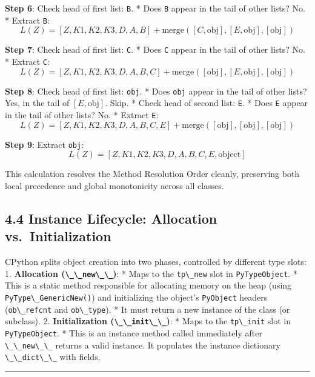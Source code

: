\textbf{Step 6}: Check head of first list: \passthrough{\lstinline!B!}.
* Does \passthrough{\lstinline!B!} appear in the tail of other lists?
No. * Extract \passthrough{\lstinline!B!}:
\[L(Z) = [Z, K1, K2, K3, D, A, B] + \text{merge}\left([C, \text{obj}], [E, \text{obj}], [\text{obj}]\right)\]

\textbf{Step 7}: Check head of first list: \passthrough{\lstinline!C!}.
* Does \passthrough{\lstinline!C!} appear in the tail of other lists?
No. * Extract \passthrough{\lstinline!C!}:
\[L(Z) = [Z, K1, K2, K3, D, A, B, C] + \text{merge}\left([\text{obj}], [E, \text{obj}], [\text{obj}]\right)\]

\textbf{Step 8}: Check head of first list:
\passthrough{\lstinline!obj!}. * Does \passthrough{\lstinline!obj!}
appear in the tail of other lists? Yes, in the tail of
\([E, \text{obj}]\). Skip. * Check head of second list:
\passthrough{\lstinline!E!}. * Does \passthrough{\lstinline!E!} appear
in the tail of other lists? No. * Extract \passthrough{\lstinline!E!}:
\[L(Z) = [Z, K1, K2, K3, D, A, B, C, E] + \text{merge}\left([\text{obj}], [\text{obj}], [\text{obj}]\right)\]

\textbf{Step 9}: Extract \passthrough{\lstinline!obj!}:
\[L(Z) = [Z, K1, K2, K3, D, A, B, C, E, \text{object}]\]

This calculation resolves the Method Resolution Order cleanly,
preserving both local precedence and global monotonicity across all
classes.

\hypertarget{instance-lifecycle-allocation-vs.-initialization}{%
\subsection{4.4 Instance Lifecycle: Allocation
vs.~Initialization}\label{instance-lifecycle-allocation-vs.-initialization}}

CPython splits object creation into two phases, controlled by different
type slots: 1. \textbf{Allocation
(\passthrough{\lstinline!\_\_new\_\_!})}: * Maps to the
\passthrough{\lstinline!tp\_new!} slot in
\passthrough{\lstinline!PyTypeObject!}. * This is a static method
responsible for allocating memory on the heap (using
\passthrough{\lstinline!PyType\_GenericNew()!}) and initializing the
object's \passthrough{\lstinline!PyObject!} headers
(\passthrough{\lstinline!ob\_refcnt!} and
\passthrough{\lstinline!ob\_type!}). * It must return a new instance of
the class (or subclass). 2. \textbf{Initialization
(\passthrough{\lstinline!\_\_init\_\_!})}: * Maps to the
\passthrough{\lstinline!tp\_init!} slot in
\passthrough{\lstinline!PyTypeObject!}. * This is an instance method
called immediately after \passthrough{\lstinline!\_\_new\_\_!} returns a
valid instance. It populates the instance dictionary
\passthrough{\lstinline!\_\_dict\_\_!} with fields.

\begin{center}\rule{0.5\linewidth}{0.5pt}\end{center}
